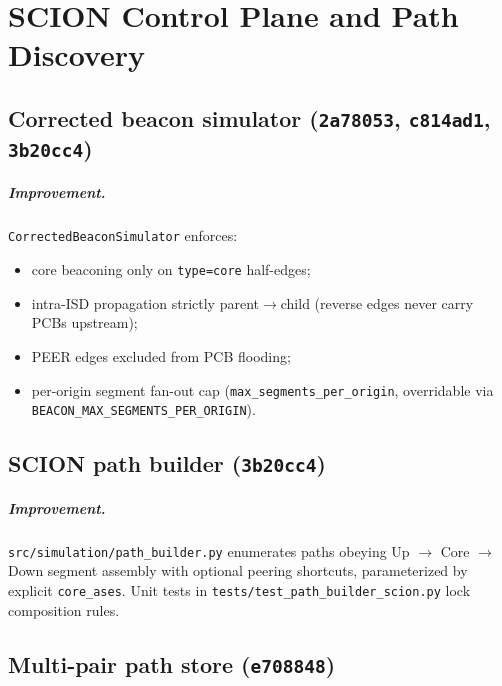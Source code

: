 \documentclass[11pt,a4paper,twoside,openright]{report}
\begin{document}
\chapter{SCION Control Plane and Path Discovery}

\section{Corrected beacon simulator (\texttt{2a78053}, \texttt{c814ad1}, \texttt{3b20cc4})}

\paragraph{Improvement.}
\texttt{CorrectedBeaconSimulator} enforces:
\begin{itemize}
  \item core beaconing only on \texttt{type=core} half-edges;
  \item intra-ISD propagation strictly parent$\rightarrow$child (reverse edges never
    carry PCBs upstream);
  \item PEER edges excluded from PCB flooding;
  \item per-origin segment fan-out cap (\texttt{max\_segments\_per\_origin}, overridable
    via \texttt{BEACON\_MAX\_SEGMENTS\_PER\_ORIGIN}).
\end{itemize}

\section{SCION path builder (\texttt{3b20cc4})}

\paragraph{Improvement.}
\texttt{src/simulation/path\_builder.py} enumerates paths obeying
Up $\rightarrow$ Core $\rightarrow$ Down segment assembly with optional peering
shortcuts, parameterized by explicit \texttt{core\_ases}.
Unit tests in \texttt{tests/test\_path\_builder\_scion.py} lock composition rules.

\section{Multi-pair path store (\texttt{e708848})}
\end{document}
